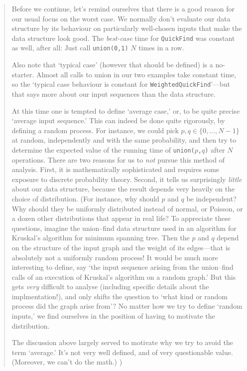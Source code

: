 \documentclass{tufte-handout}
\begin{document}
\begin{quotation}
  Before we continue, let's remind ourselves that there is a good reason for our usual focus on the worst case.
  We normally don't evaluate our data structure by its behaviour on particularly well-chosen inputs that make the data structure look good. 
  The \emph{best-case} time for {\tt QuickFind} was constant as well, after all: Just call {\tt union(0,1)} $N$ times in a row.

  Also note that `typical case' (however that should be defined) is a no-starter.
  Almost all calls to union in our two examples take constant time, so
  the `typical case behaviour is constant for {\tt WeightedQuickFind}'---but that says more about our input sequences than the data structure.

  At this time one is tempted to define `average case,' or, to be quite precise `average input sequence.'
  This can indeed be done quite rigorously, by defining a random process.
  For instance, we could pick $p,q\in\{0,\ldots, N-1\}$ at random, independently and with the same probability, and then try to determine the expected value of the running time of {\tt union($p$,$q$)} after $N$ operations.
  There are two reasons for us to \emph{not} pursue this method of analysis.
  First, it is mathematically sophisticated and requires some exposure to discrete probability theory.
  Second, it tells us surprisingly \emph{little} about our data structure, because the result depends very heavily on the choice of distribution.
  (For instance, why should $p$ and $q$ be independent? 
  Why should they be uniformly distributed instead of normal, or Poisson, or a dozen other distributions that appear in real life?
  To appreciate these questions, imagine the union--find data structure used in an algorithm for Kruskal's algorithm for minimum spanning tree.
  Then the $p$ and $q$ depend on the structure of the input graph and the weight of its edges---that is absolutely not a uniformly random process!
  It would be much more interesting to define, say `the input sequence arising from the union--find calls of an execution of Kruskal's algorithm on a random graph.'
  But this gets \emph{very} difficult to analyse (including specific details about the implmentation!), and only shifts the question to `what kind or random process did the graph arise from'?
  No matter how we try to define `random inputs,' we find ourselves in the position of having to motivate the distribution.
  
  The discussion above largely served to motivate why we try to avoid the term `average.'
  It's not very well defined, and of very questionable value.
  (Moreover, we can't do the math.)
  )
\end{quotation}
\end{document}
